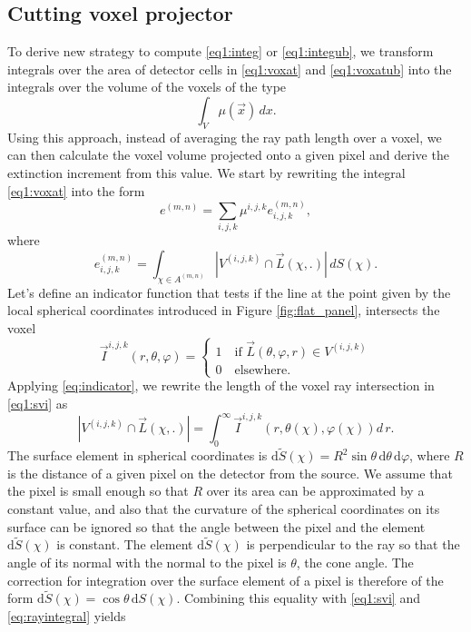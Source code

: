 \subsection{Cutting voxel projector}

To derive new strategy to compute \eqref{eq1:integ} or \eqref{eq1:integub}, we transform integrals over the area of detector cells in \eqref{eq1:voxat} and \eqref{eq1:voxatub} into the integrals over the volume of the voxels of the type
\begin{equation}
    \int_V \mu(\vec{x})\,dx. \label{eqx:volint}
\end{equation}
Using this approach, instead of averaging the ray path length over a voxel, we can then calculate the voxel volume projected onto a given pixel and derive the extinction increment from this value. We start by rewriting the integral \eqref{eq1:voxat} into the form
\begin{equation}
    e^{(m,n)} = \sum_{i,j,k} \mu^{i,j,k} e_{i,j,k}^{(m,n)},
\end{equation}
where
\begin{equation}
     e_{i,j,k}^{(m,n)} = \int_{\chi \in A^{(m,n)}}  |V^{(i,j,k)} \cap \vec{L}(\chi, .)| \,dS(\chi).\label{eq1:svi}
\end{equation}
Let's define an indicator function that tests if the line at the point given by the local spherical coordinates introduced in Figure \ref{fig:flat_panel}, intersects the voxel
\begin{equation}
\vec{I}^{i,j,k}(r, \theta, \varphi) = 
\begin{cases} 1 \quad \mbox{if } \vec{L}(\theta, \varphi, r) \in V^{(i,j,k)} \\
0 \quad \mbox{elsewhere.} \end{cases}
\label{eq:indicator}
\end{equation}
Applying \eqref{eq:indicator}, we rewrite the length of the voxel ray intersection in \eqref{eq1:svi} as
\begin{equation}
    |V^{(i,j,k)} \cap \vec{L}(\chi, .)| = \int_0^\infty \vec{I}^{i,j,k}(r, \theta(\chi), \varphi(\chi)) d\,r.
    \label{eq:rayintegral}
\end{equation}
The surface element in spherical coordinates is $\mathrm{d}\tilde{S}(\chi) = R^2 \sin{\theta} \,\mathrm{d}\theta \,\mathrm{d}\varphi$, where $R$ is the distance of a given pixel on the detector from the source. We assume that the pixel is small enough so that $R$ over its  area can be approximated by a constant value, and also that the curvature of the spherical coordinates on its surface can be ignored so that the angle between the pixel and the element $\mathrm{d}\tilde{S}(\chi)$ is constant. The element $\mathrm{d}\tilde{S}(\chi)$ is perpendicular to the ray so that the angle of its normal with the normal to the pixel is $\theta$, the cone angle. The correction for integration over the surface element of a pixel is therefore of the form $\mathrm{d}\tilde{S}(\chi) = \cos{\theta} \,\mathrm{d}S(\chi)$. Combining this equality with \eqref{eq1:svi} and \eqref{eq:rayintegral} yields
